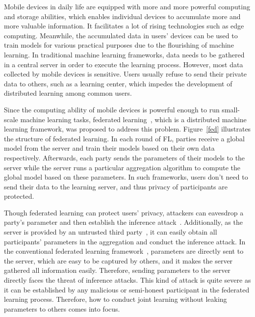 Mobile devices in daily life are equipped with more and more powerful computing and storage abilities, which enables individual devices to accumulate more and more valuable information. It facilitates a lot of rising technologies such as edge computing. Meanwhile, the accumulated data in users' devices can be used to train models for various practical purposes due to the flourishing of machine learning. In traditional machine learning frameworks, data needs to be gathered in a central server in order to execute the learning process. However, most data collected by mobile devices is sensitive. Users usually refuse to send their private data to others, such as a learning center, which impedes the development of distributed learning among common users.

Since the computing ability of mobile devices is powerful enough to run small-scale machine learning tasks, federated learning~\cite{mcmahan2016communicationefficient}, which is a distributed machine learning framework, was proposed to address this problem. Figure~\ref{fed} illustrates the structure of federated learning. In each round of FL, parties receive a global model from the server and train their models based on their own data respectively. Afterwards, each party sends the parameters of their models to the server while the server runs a particular aggregation algorithm to compute the global model based on these parameters. In such frameworks, users don't need to send their data to the learning server, and thus privacy of participants are protected.

Though federated learning can protect users' privacy, attackers can eavesdrop a party's parameter and then establish the inference attack~\cite{Beyond, Leakage, Nasr19}.
Additionally, as the server is provided by an untrusted third party~\cite{Nasr19}, it can easily obtain all participants' parameters in the aggregation and conduct the inference attack. In the conventional federated learning framework~\cite{mcmahan2016communicationefficient}, parameters are directly sent to the server, which are easy to be captured by others, and it makes the server gathered all information easily. Therefore, sending parameters to the server directly faces the threat of inference attacks. This kind of attack is quite severe as it can be established by any malicious or semi-honest participant in the federated learning process. Therefore, how to conduct joint learning without leaking parameters to others comes into focus.

